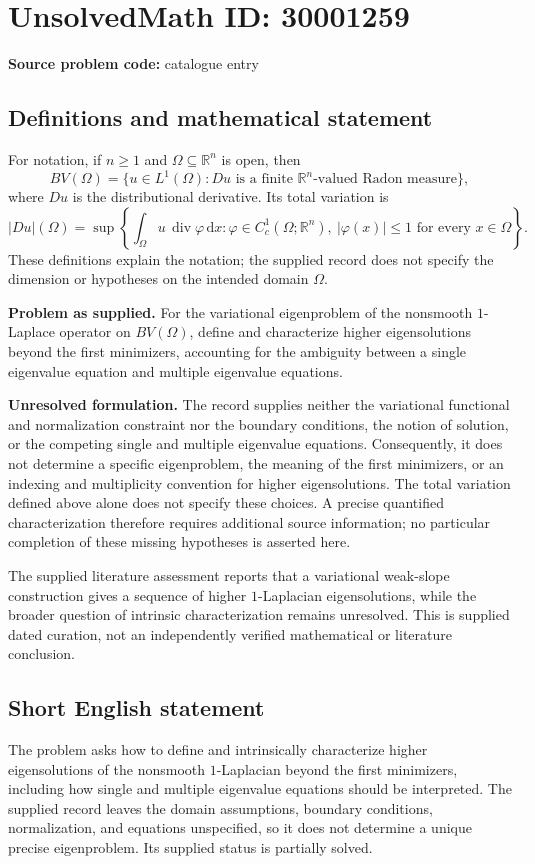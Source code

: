 \documentclass[11pt]{article}
\newcommand{\R}{\mathbb{R}}
\begin{document}
\section*{UnsolvedMath ID: 30001259}
\textbf{Source problem code:} catalogue entry
\subsection{Definitions and mathematical statement}
For notation, if \(n\geq 1\) and \(\Omega\subseteq\R^n\) is open, then
\[
BV(\Omega)=\{u\in L^1(\Omega):Du\text{ is a finite }\R^n\text{-valued Radon measure}\},
\]
where \(Du\) is the distributional derivative. Its total variation is
\[
|Du|(\Omega)=\sup\left\{\int_\Omega u\,\operatorname{div}\varphi\,\mathrm{d}x:
\varphi\in C_c^1(\Omega;\R^n),\ |\varphi(x)|\leq 1\text{ for every }x\in\Omega\right\}.
\]
These definitions explain the notation; the supplied record does not specify the dimension or hypotheses on the intended domain \(\Omega\).

\textbf{Problem as supplied.} For the variational eigenproblem of the nonsmooth \(1\)-Laplace operator on \(BV(\Omega)\), define and characterize higher eigensolutions beyond the first minimizers, accounting for the ambiguity between a single eigenvalue equation and multiple eigenvalue equations.

\textbf{Unresolved formulation.} The record supplies neither the variational functional and normalization constraint nor the boundary conditions, the notion of solution, or the competing single and multiple eigenvalue equations. Consequently, it does not determine a specific eigenproblem, the meaning of the first minimizers, or an indexing and multiplicity convention for higher eigensolutions. The total variation defined above alone does not specify these choices. A precise quantified characterization therefore requires additional source information; no particular completion of these missing hypotheses is asserted here.

The supplied literature assessment reports that a variational weak-slope construction gives a sequence of higher \(1\)-Laplacian eigensolutions, while the broader question of intrinsic characterization remains unresolved. This is supplied dated curation, not an independently verified mathematical or literature conclusion.
\subsection{Short English statement}
The problem asks how to define and intrinsically characterize higher eigensolutions of the nonsmooth \(1\)-Laplacian beyond the first minimizers, including how single and multiple eigenvalue equations should be interpreted. The supplied record leaves the domain assumptions, boundary conditions, normalization, and equations unspecified, so it does not determine a unique precise eigenproblem. Its supplied status is partially solved.
\end{document}
